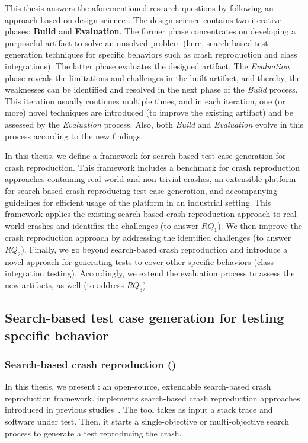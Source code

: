 This thesis answers the aforementioned research questions by following an approach based on design science \cite{Hevner2004}.
The design science contains two iterative phases: \textbf{Build} and \textbf{Evaluation}. The former phase concentrates on developing a purposeful artifact to solve an unsolved problem (here, search-based test generation techniques for specific behaviors such as crash reproduction and class integrations). The latter phase evaluates the designed artifact.
The \textit{Evaluation} phase reveals the limitations and challenges in the built artifact, and thereby, the weaknesses can be identified and resolved in the next phase of the \textit{Build} process. This iteration usually continues multiple times, and in each iteration, one (or more) novel techniques are introduced (to improve the existing artifact) and be assessed by the \textit{Evaluation} process. Also, both \textit{Build} and \textit{Evaluation} evolve in this process according to the new findings. 

In this thesis, we define a framework for search-based test case generation for crash reproduction. This framework includes a benchmark for crash reproduction approaches containing real-world and non-trivial crashes, an extensible platform for search-based crash reproducing test case generation, and accompanying guidelines for efficient usage of the platform in an industrial setting. This framework applies the existing search-based crash reproduction approach to real-world crashes and identifies the challenges (to answer $RQ_1$). We then improve the crash reproduction approach by addressing the identified challenges (to answer $RQ_2$). Finally, we go beyond search-based crash reproduction and introduce a novel approach for generating tests to cover other specific behaviors (\eg class integration testing). Accordingly, we extend the evaluation process to assess the new artifacts, as well (to address $RQ_3$).

\subsection{Search-based test case generation for testing specific behavior}
\subsubsection{Search-based crash reproduction (\botsing)}
In this thesis, we present \botsing: an open-source, extendable search-based crash reproduction framework. \botsing implements search-based crash reproduction approaches introduced in previous studies~\cite{Rossler2013, Soltani2018a, Soltani2018b}. The tool takes as input a stack trace and software under test. Then, it starts a single-objective or multi-objective search process to generate a test reproducing the crash.

